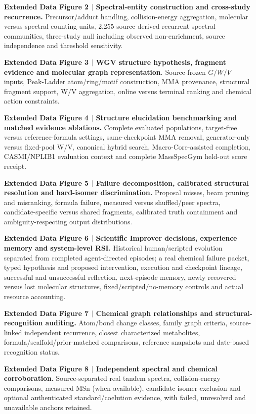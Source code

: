 \documentclass[11pt]{article}
\begin{document}
\noindent\textbf{Extended Data Figure 2 | Spectral-entity construction and cross-study recurrence.}
Precursor/adduct handling, collision-energy aggregation, molecular versus spectral counting units, 2,255 source-derived recurrent spectral communities, three-study null including observed non-enrichment, source independence and threshold sensitivity.

\noindent\textbf{Extended Data Figure 3 | WGV structure hypothesis, fragment evidence and molecular graph representation.}
Source-frozen \(G/W/V\) inputs, Peak-Ladder atom/ring/motif construction, MMA provenance, structural fragment support, W/V aggregation, online versus terminal ranking and chemical action constraints.

\noindent\textbf{Extended Data Figure 4 | Structure elucidation benchmarking and matched evidence ablations.}
Complete evaluated populations, target-free versus reference-formula settings, same-checkpoint MMA removal, generator-only versus fixed-pool W/V, canonical hybrid search, Macro-Core-assisted completion, CASMI/NPLIB1 evaluation context and complete MassSpecGym held-out score receipt.

\noindent\textbf{Extended Data Figure 5 | Failure decomposition, calibrated structural resolution and hard-isomer discrimination.}
Proposal misses, beam pruning and misranking, formula failure, measured versus shuffled/peer spectra, candidate-specific versus shared fragments, calibrated truth containment and ambiguity-respecting output distributions.

\noindent\textbf{Extended Data Figure 6 | Scientific Improver decisions, experience memory and system-level RSI.}
Historical human/scripted evolution separated from completed agent-directed episodes; a real chemical failure packet, typed hypothesis and proposed intervention, execution and checkpoint lineage, successful and unsuccessful reflection, next-episode memory, newly recovered versus lost molecular structures, fixed/scripted/no-memory controls and actual resource accounting.

\noindent\textbf{Extended Data Figure 7 | Chemical graph relationships and structural-recognition auditing.}
Atom/bond change classes, family graph criteria, source-linked independent recurrence, closest characterized metabolites, formula/scaffold/prior-matched comparisons, reference snapshots and date-based recognition status.

\noindent\textbf{Extended Data Figure 8 | Independent spectral and chemical corroboration.}
Source-separated real tandem spectra, collision-energy comparisons, measured MSn (when available), candidate-isomer exclusion and optional authenticated standard/coelution evidence, with failed, unresolved and unavailable anchors retained.
\end{document}
